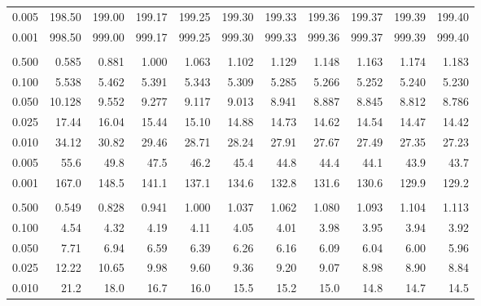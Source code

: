 \documentclass[
]{article}
\begin{document}
\begin{longtable}[t]{lrrrrrrrrrr}
\hspace{1em}0.005 & 198.50 & 199.00 & 199.17 & 199.25 & 199.30 & 199.33 & 199.36 & 199.37 & 199.39 & 199.40\\
\hspace{1em}0.001 & 998.50 & 999.00 & 999.17 & 999.25 & 999.30 & 999.33 & 999.36 & 999.37 & 999.39 & 999.40\\
\addlinespace[0.3em]
\multicolumn{11}{l}{\textbf{$k_2=3$}}\\
\hspace{1em}0.500 & 0.585 & 0.881 & 1.000 & 1.063 & 1.102 & 1.129 & 1.148 & 1.163 & 1.174 & 1.183\\
\hspace{1em}0.100 & 5.538 & 5.462 & 5.391 & 5.343 & 5.309 & 5.285 & 5.266 & 5.252 & 5.240 & 5.230\\
\hspace{1em}0.050 & 10.128 & 9.552 & 9.277 & 9.117 & 9.013 & 8.941 & 8.887 & 8.845 & 8.812 & 8.786\\
\hspace{1em}0.025 & 17.44 & 16.04 & 15.44 & 15.10 & 14.88 & 14.73 & 14.62 & 14.54 & 14.47 & 14.42\\
\hspace{1em}0.010 & 34.12 & 30.82 & 29.46 & 28.71 & 28.24 & 27.91 & 27.67 & 27.49 & 27.35 & 27.23\\
\hspace{1em}0.005 & 55.6 & 49.8 & 47.5 & 46.2 & 45.4 & 44.8 & 44.4 & 44.1 & 43.9 & 43.7\\
\hspace{1em}0.001 & 167.0 & 148.5 & 141.1 & 137.1 & 134.6 & 132.8 & 131.6 & 130.6 & 129.9 & 129.2\\
\addlinespace[0.3em]
\multicolumn{11}{l}{\textbf{$k_2=4$}}\\
\hspace{1em}0.500 & 0.549 & 0.828 & 0.941 & 1.000 & 1.037 & 1.062 & 1.080 & 1.093 & 1.104 & 1.113\\
\hspace{1em}0.100 & 4.54 & 4.32 & 4.19 & 4.11 & 4.05 & 4.01 & 3.98 & 3.95 & 3.94 & 3.92\\
\hspace{1em}0.050 & 7.71 & 6.94 & 6.59 & 6.39 & 6.26 & 6.16 & 6.09 & 6.04 & 6.00 & 5.96\\
\hspace{1em}0.025 & 12.22 & 10.65 & 9.98 & 9.60 & 9.36 & 9.20 & 9.07 & 8.98 & 8.90 & 8.84\\
\hspace{1em}0.010 & 21.2 & 18.0 & 16.7 & 16.0 & 15.5 & 15.2 & 15.0 & 14.8 & 14.7 & 14.5\\

\end{longtable}
\end{document}
